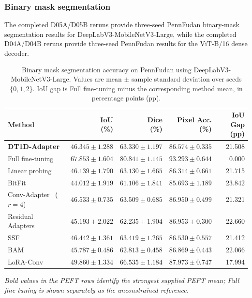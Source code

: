 \documentclass[pdflatex,sn-mathphys-num]{sn-jnl}
\theoremstyle{thmstyleone}
\theoremstyle{thmstyletwo}
\theoremstyle{thmstylethree}
\begin{document}
\subsubsection{Binary mask segmentation}

The completed D05A/D05B reruns provide three-seed PennFudan binary-mask segmentation results for DeepLabV3-MobileNetV3-Large, while the completed D04A/D04B reruns provide three-seed PennFudan results for the ViT-B/16 dense decoder.

\begin{table}[!htbp]
\centering
\caption{Binary mask segmentation accuracy on PennFudan using DeepLabV3-MobileNetV3-Large. Values are mean $\pm$ sample standard deviation over seeds $\{0,1,2\}$. IoU gap is Full fine-tuning minus the corresponding method mean, in percentage points (pp).}
\label{tab:seg_acc_deeplab_pennfudan}
\scriptsize
\setlength{\tabcolsep}{3pt}
\renewcommand{\arraystretch}{1.12}
\begin{tabularx}{\columnwidth}{@{}Xrrrr@{}}
\toprule
\textbf{Method} &
\makecell{\textbf{IoU}\\\textbf{(\%)}} &
\makecell{\textbf{Dice}\\\textbf{(\%)}} &
\makecell{\textbf{Pixel Acc.}\\\textbf{(\%)}} &
\makecell{\textbf{IoU Gap}\\\textbf{(pp)}} \\
\midrule
\textbf{DT1D-Adapter} & $46.345\pm1.288$ & $63.330\pm1.197$ & $86.574\pm0.335$ & 21.508 \\
Full fine-tuning & $\mathbf{67.853\pm1.604}$ & $\mathbf{80.841\pm1.145}$ & $\mathbf{93.293\pm0.644}$ & 0.000 \\
Linear probing & $46.139\pm1.790$ & $63.130\pm1.665$ & $86.314\pm0.661$ & 21.715 \\
BitFit~\cite{zaken2022bitfit} & $44.012\pm1.919$ & $61.106\pm1.841$ & $85.693\pm1.189$ & 23.842 \\
Conv-Adapter~\cite{chen2024convadapter} ($r=4$) & $46.533\pm0.735$ & $63.509\pm0.685$ & $86.950\pm0.499$ & 21.321 \\
Residual Adapters~\cite{rebuffi2017residual} & $45.193\pm2.022$ & $62.235\pm1.904$ & $86.953\pm0.300$ & 22.660 \\
SSF~\cite{lian2022ssf} & $46.442\pm1.361$ & $63.419\pm1.265$ & $86.530\pm0.557$ & 21.412 \\
BAM~\cite{park2020lightweightattention} & $45.787\pm0.486$ & $62.813\pm0.458$ & $86.869\pm0.443$ & 22.066 \\
LoRA-Conv~\cite{hu2022lora,chollet2017xception} & $\mathbf{49.860\pm1.334}$ & $\mathbf{66.535\pm1.184}$ & $\mathbf{87.973\pm0.747}$ & 17.994 \\
\bottomrule
\end{tabularx}

\vspace{2pt}
{\footnotesize\textit{Bold values in the PEFT rows identify the strongest supplied PEFT mean; Full fine-tuning is shown separately as the unconstrained reference.}}
\end{table}
\end{document}
